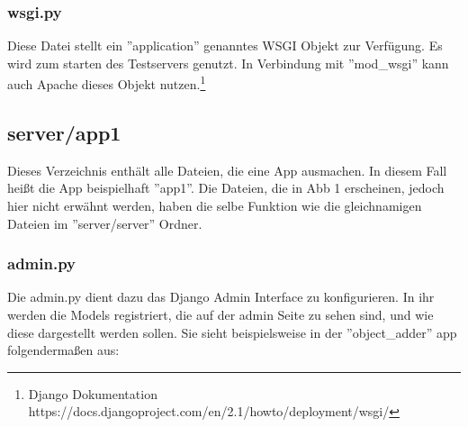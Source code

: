 \documentclass{article}
\begin{document}
\subsubsection{wsgi.py}
Diese Datei stellt ein ''application'' genanntes WSGI Objekt zur Verfügung. Es wird zum starten des Testservers genutzt. In Verbindung mit ''mod\_wsgi'' kann auch Apache dieses Objekt nutzen.\footnote{Django Dokumentation https://docs.djangoproject.com/en/2.1/howto/deployment/wsgi/}
\subsection{server/app1}
Dieses Verzeichnis enthält alle Dateien, die eine App ausmachen. In diesem Fall heißt die App beispielhaft ''app1''. Die Dateien, die in Abb 1 erscheinen, jedoch hier nicht erwähnt werden, haben die selbe Funktion wie die gleichnamigen Dateien im ''server/server'' Ordner.

\subsubsection{admin.py}
Die admin.py dient dazu das Django Admin Interface zu konfigurieren. In ihr werden die Models registriert, die auf der admin Seite zu sehen sind, und wie diese dargestellt werden sollen. Sie sieht beispielsweise in der ''object\_adder'' app folgendermaßen aus:
\end{document}
